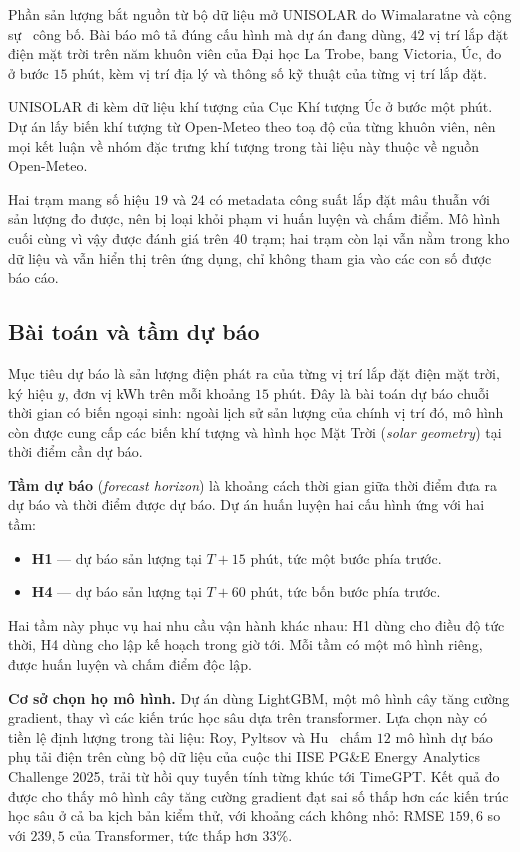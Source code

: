 Phần sản lượng bắt nguồn từ bộ dữ liệu mở UNISOLAR do Wimalaratne và cộng
sự~\cite{wimalaratne2022unisolar} công bố. Bài báo mô tả đúng cấu hình mà dự án đang
dùng, $42$ vị trí lắp đặt điện mặt trời trên năm khuôn viên của Đại học La Trobe, bang Victoria,
Úc, đo ở bước $15$ phút, kèm vị trí địa lý và thông số kỹ thuật của từng vị trí lắp đặt.

UNISOLAR đi kèm dữ liệu khí tượng của Cục Khí tượng Úc ở bước một phút. Dự án lấy biến
khí tượng từ Open-Meteo theo toạ độ của từng khuôn viên, nên mọi kết luận về
nhóm đặc trưng khí tượng trong tài liệu này thuộc về nguồn Open-Meteo.

Hai trạm mang số hiệu $19$ và $24$ có metadata công suất lắp đặt mâu thuẫn với
sản lượng đo được, nên bị loại khỏi phạm vi huấn luyện và chấm điểm. Mô hình cuối cùng
vì vậy được đánh giá trên $40$ trạm; hai trạm còn lại vẫn nằm trong kho dữ liệu và vẫn
hiển thị trên ứng dụng, chỉ không tham gia vào các con số được báo cáo.

\FloatBarrier
\subsection{Bài toán và tầm dự báo}

Mục tiêu dự báo là sản lượng điện phát ra của từng vị trí lắp đặt điện mặt trời, ký hiệu
$y$, đơn vị kWh trên mỗi khoảng $15$ phút. Đây là bài toán dự báo chuỗi thời gian có
biến ngoại sinh: ngoài lịch sử sản lượng của chính vị trí đó, mô hình còn được cung cấp
các biến khí tượng và hình học Mặt Trời (\textit{solar geometry}) tại thời điểm cần dự báo.

\textbf{Tầm dự báo} (\textit{forecast horizon}) là khoảng cách thời gian giữa thời
điểm đưa ra dự báo và thời điểm được dự báo. Dự án huấn luyện hai cấu hình ứng với hai
tầm:

\begin{itemize}
    \item \textbf{H1} --- dự báo sản lượng tại $T + 15$ phút, tức một bước phía trước.
    \item \textbf{H4} --- dự báo sản lượng tại $T + 60$ phút, tức bốn bước phía trước.
\end{itemize}

Hai tầm này phục vụ hai nhu cầu vận hành khác nhau: H1 dùng cho điều độ tức thời, H4
dùng cho lập kế hoạch trong giờ tới. Mỗi tầm có một mô hình riêng, được huấn luyện và
chấm điểm độc lập.

\textbf{Cơ sở chọn họ mô hình.} Dự án dùng LightGBM, một mô hình cây tăng cường
gradient, thay vì các kiến trúc học sâu dựa trên transformer. Lựa chọn này có tiền
lệ định lượng trong tài liệu: Roy, Pyltsov và Hu~\cite{roy2025hourly} chấm $12$ mô hình
dự báo phụ tải điện trên cùng bộ dữ liệu của cuộc thi IISE PG\&E Energy Analytics
Challenge 2025, trải từ hồi quy tuyến tính từng khúc tới TimeGPT. Kết quả đo được cho
thấy mô hình cây tăng cường gradient đạt sai số thấp hơn các kiến trúc học sâu ở cả ba
kịch bản kiểm thử, với khoảng cách không nhỏ: RMSE $159{,}6$ so với $239{,}5$ của
Transformer, tức thấp hơn $33\%$.

